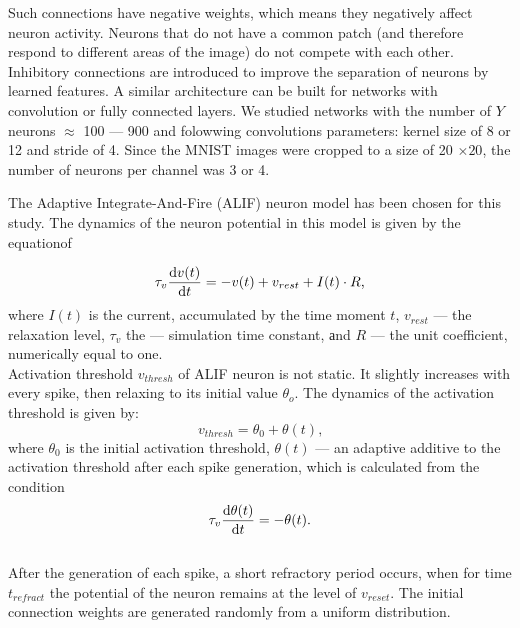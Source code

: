 \documentclass[a4paper,10pt]{article}
\begin{document}
Such connections have negative weights, which means they negatively affect neuron activity. Neurons that do not have a common patch (and therefore respond to different areas of the image) do not compete with each other. Inhibitory connections are introduced to improve the separation of neurons by learned features. A similar architecture can be built for networks with convolution or fully connected layers. We studied networks with the number of $Y$ neurons $\approx$ 100 --- 900 and folowwing convolutions parameters: kernel size of 8 or 12 and stride of 4. Since the MNIST images were cropped to a size of 20 $\times 20$, the number of neurons per channel was 3 or 4.

The Adaptive Integrate-And-Fire (ALIF) neuron model has been chosen for this study. The dynamics of the neuron potential in this model is given by the equationof

\begin{equation} \label{eq:alif}
 \tau_v \dv{v(t)}{t} = -v(t) + v_{rest} + I(t) \cdot R \text{,}
\end{equation} where $I(t)$ is the current, accumulated by the time moment $t$, $v_{rest}$ --- the relaxation level, $\tau_v$ the --- simulation time constant, аnd $R$ --- the unit coefficient, numerically equal to one.\\ 

Activation threshold $v_{thresh}$ of ALIF neuron is not static. It slightly increases with every spike, then relaxing to its initial value $\theta_o$. The dynamics of the activation threshold is given by:
\begin{equation} 
 v_{thresh} = \theta_0 + \theta(t) \text{,}
\end{equation} where $\theta_0$ is the initial activation threshold, $\theta(t)$ --- an adaptive additive to the activation threshold after each spike generation, which is calculated from the condition\\

\begin{equation}
 \tau_v \dv{\theta(t)}{t} = -\theta(t).
\end{equation}\\

After the generation of each spike, a short refractory period occurs, when for time $t_{refract}$ the potential of the neuron remains at the level of $v_{reset}$. The initial connection weights are generated randomly from a uniform distribution.
\end{document}
